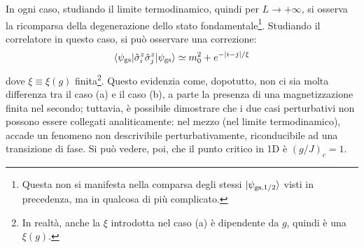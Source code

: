 \documentclass[11pt, a4paper]{scrartcl}
\theoremstyle{style}
\theoremstyle{style1}
\numberwithin{equation}{subsection}
\begin{document}
In ogni caso, studiando il limite termodinamico, quindi per $L\to +\infty$, si osserva la ricomparsa della degenerazione dello stato fondamentale\footnote{Questa non si manifesta nella comparsa degli stessi $\ket{\psi _{\text{gs},1 / 2} } $ visti in precedenza, ma in qualcosa di pi\`u complicato.}. 
Studiando il correlatore in questo caso, si pu\`o osservare una correzione:
\[
\braket{\psi_\text{gs} |\hat{\sigma }_i^z \hat{\sigma }_j^z|\psi _\text{gs}} \simeq m_0^2 + e^{- \lvert i - j \rvert / \xi }
\] 
dove $\xi  \equiv \xi (g)$ finita\footnote{In realt\`a, anche la $\xi $ introdotta nel caso (a) \`e dipendente da $g$, quindi \`e una $\xi (g)$.}. 
Questo evidenzia come, dopotutto, non ci sia molta differenza tra il caso (a) e il caso (b), a parte la presenza di una magnetizzazione finita nel secondo; tuttavia, \`e possibile dimostrare che i due casi perturbativi non possono essere collegati analiticamente: nel mezzo (nel limite termodinamico), accade un fenomeno non descrivibile perturbativamente, riconducibile ad una transizione di fase.
Si pu\`o vedere, poi, che il punto critico in 1D \`e $(g / J)_c = 1$.
\begin{center}
\end{center}
\end{document}
